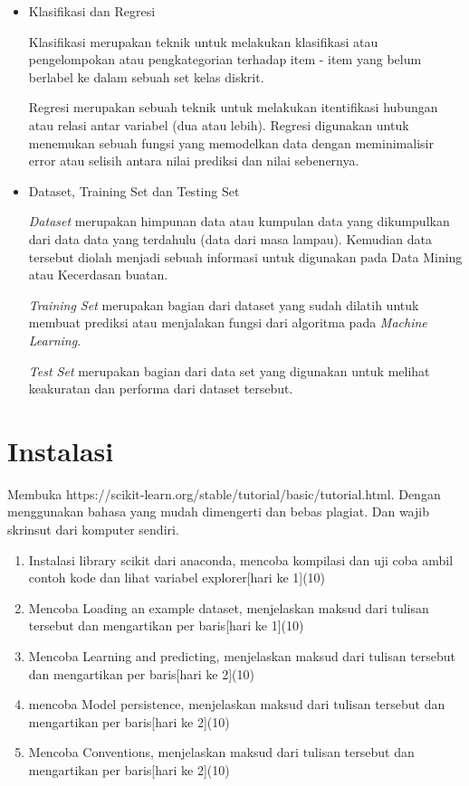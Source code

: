 \begin{enumerate}
\begin{itemize}
\item Klasifikasi dan Regresi
\par \setlength{\parindent}{10ex}
Klasifikasi merupakan teknik untuk melakukan klasifikasi atau pengelompokan atau pengkategorian terhadap item - item yang belum berlabel ke dalam sebuah set kelas diskrit.
\par Regresi merupakan sebuah teknik untuk melakukan itentifikasi hubungan atau relasi antar variabel (dua atau lebih). Regresi digunakan untuk menemukan sebuah fungsi yang memodelkan data dengan meminimalisir error atau selisih antara nilai prediksi dan nilai sebenernya.

\item Dataset, Training Set dan Testing Set
\par \setlength{\parindent}{10ex}
\emph{Dataset} merupakan himpunan data atau kumpulan data yang dikumpulkan dari data data yang terdahulu (data dari masa lampau). Kemudian data tersebut diolah menjadi sebuah informasi untuk digunakan pada Data Mining atau Kecerdasan buatan.
\par \emph{Training Set} merupakan bagian dari dataset yang sudah dilatih untuk membuat prediksi atau menjalakan fungsi dari algoritma pada \emph{Machine Learning}.
\par \emph{Test Set} merupakan bagian dari data set yang digunakan untuk melihat keakuratan dan performa dari dataset tersebut.

\end{itemize}
\end{enumerate}

\section{Instalasi}
Membuka https://scikit-learn.org/stable/tutorial/basic/tutorial.html. Dengan menggunakan bahasa yang mudah dimengerti dan bebas plagiat. 
Dan wajib skrinsut dari komputer sendiri.
\begin{enumerate}
\item
Instalasi library scikit dari anaconda, mencoba kompilasi dan uji coba ambil contoh kode dan lihat variabel explorer[hari ke 1](10)
\item
Mencoba Loading an example dataset, menjelaskan maksud dari tulisan tersebut dan mengartikan per baris[hari ke 1](10)
\item
Mencoba Learning and predicting, menjelaskan maksud dari tulisan tersebut dan mengartikan per baris[hari ke 2](10)
\item
mencoba Model persistence, menjelaskan maksud dari tulisan tersebut dan mengartikan per baris[hari ke 2](10)
\item 
Mencoba Conventions, menjelaskan maksud dari tulisan tersebut dan mengartikan per baris[hari ke 2](10)
\end{enumerate}


